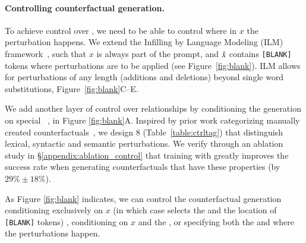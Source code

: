 \paragraph{Controlling counterfactual generation.}
To achieve control over \relation{\xp}, we need to be able to control where in $x$ the perturbation happens. 
We extend the Infilling by Language Modeling (ILM) framework~\cite{donahue2020enabling}, such that $x$ is always part of the prompt, and $\hat{x}$ contains \texttt{[BLANK]} tokens where perturbations are to be applied (see Figure~\ref{fig:blank}). 
ILM allows for perturbations of any length (additions and deletions) beyond single word substitutions, \eg Figure~\ref{fig:blank}C--E.

We add another layer of control over relationships by conditioning the generation on special \tagstrs~\cite{raffel2019exploring, Dathathri2020Plug}, \eg {} in Figure \ref{fig:blank}A.
Inspired by prior work categorizing manually created counterfactuals~\cite{kaushik2019learning, gardner2020contrast}, we design 8 \tagstrshorts (Table~\ref{table:ctrltag}) that distinguish lexical, syntactic and semantic perturbations. 
We verify through an ablation study in \S\ref{appendix:ablation_control} that training \sysname with \tagstrs greatly improves the success rate when generating counterfactuals that have these properties (by $29\% \pm 18\%$). 

As Figure \ref{fig:blank} indicates, we can control the counterfactual generation conditioning exclusively on $x$ (in which case \sysname selects the \tagstr and the location of \texttt{[BLANK]} tokens) , conditioning on $x$ and the \tagstr, or specifying both the \tagstrshort and where the perturbations happen.




